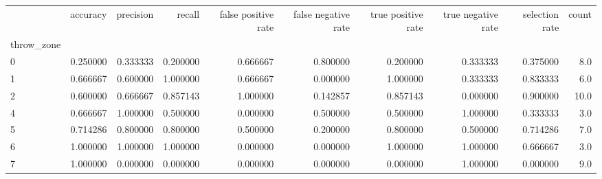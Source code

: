 \begin{tabular}{lrrrrrrrrr}
\toprule
{} &  accuracy &  precision &    recall &  false positive rate &  false negative rate &  true positive rate &  true negative rate &  selection rate &  count \\
throw\_zone &           &            &           &                      &                      &                     &                     &                 &        \\
\midrule
0          &  0.250000 &   0.333333 &  0.200000 &             0.666667 &             0.800000 &            0.200000 &            0.333333 &        0.375000 &    8.0 \\
1          &  0.666667 &   0.600000 &  1.000000 &             0.666667 &             0.000000 &            1.000000 &            0.333333 &        0.833333 &    6.0 \\
2          &  0.600000 &   0.666667 &  0.857143 &             1.000000 &             0.142857 &            0.857143 &            0.000000 &        0.900000 &   10.0 \\
4          &  0.666667 &   1.000000 &  0.500000 &             0.000000 &             0.500000 &            0.500000 &            1.000000 &        0.333333 &    3.0 \\
5          &  0.714286 &   0.800000 &  0.800000 &             0.500000 &             0.200000 &            0.800000 &            0.500000 &        0.714286 &    7.0 \\
6          &  1.000000 &   1.000000 &  1.000000 &             0.000000 &             0.000000 &            1.000000 &            1.000000 &        0.666667 &    3.0 \\
7          &  1.000000 &   0.000000 &  0.000000 &             0.000000 &             0.000000 &            0.000000 &            1.000000 &        0.000000 &    9.0 \\
\bottomrule
\end{tabular}
